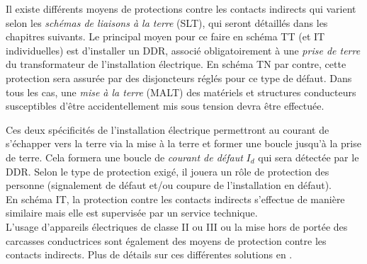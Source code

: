 \documentclass[a4paper, 11pt, twoside, fleqn]{memoir}
\begin{document}
Il existe différents moyens de protections contre les contacts indirects qui varient selon les \emph{schémas de liaisons à la terre} (SLT), qui seront détaillés dans les chapitres suivants. Le principal moyen pour ce faire en schéma TT (et IT individuelles) est d'installer un DDR, associé obligatoirement à une \emph{prise de terre} du transformateur de l'installation électrique. En schéma TN par contre, cette protection sera assurée par des disjoncteurs réglés pour ce type de défaut. Dans tous les cas, une \emph{mise à la terre} (MALT) des matériels et structures conducteurs susceptibles d'être accidentellement mis sous tension devra être effectuée.

Ces deux spécificités de l'installation électrique permettront au courant de s'échapper vers la terre via la mise à la terre et former une boucle jusqu'à la prise de terre. Cela formera une boucle de \emph{courant de défaut} \(I_d\) qui sera détectée par le DDR. Selon le type de protection exigé, il jouera un rôle de protection des personne (signalement de défaut et/ou coupure de l'installation en défaut).\\
En schéma IT, la protection contre les contacts indirects s'effectue de manière similaire mais elle est supervisée par un service technique.\\

L'usage d'appareils électriques de classe II ou III ou la mise hors de portée des carcasses conductrices sont également des moyens de protection contre les contacts indirects. Plus de détails sur ces différentes solutions en . 
\end{document}
